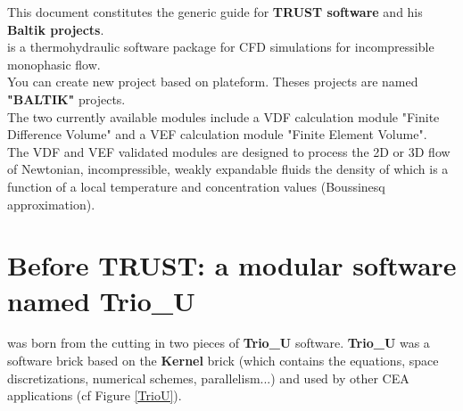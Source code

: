 This document constitutes the generic guide for \textbf{TRUST software} and his \textbf{Baltik projects}.\\

\trust is a thermohydraulic software package for CFD simulations for incompressible monophasic flow.\\

You can create new project based on \trust plateform. Theses projects are named \textbf{"BALTIK"} projects.\\

The two currently available modules include a VDF calculation module "Finite Difference Volume" and a VEF calculation module "Finite Element Volume". \\

The VDF and VEF validated modules are designed to process the 2D or 3D flow of Newtonian, incompressible, weakly expandable fluids the density of which is a function of a local temperature and concentration values (Boussinesq approximation).



\section{Before TRUST: a modular software named Trio\_U}

\trust was born from the cutting in two pieces of \textbf{Trio\_U} software.
\textbf{Trio\_U} was a software brick based on the \textbf{Kernel} brick (which contains the equations, space discretizations, numerical schemes, parallelism...) and used by other CEA applications (cf Figure \ref{TrioU}).

